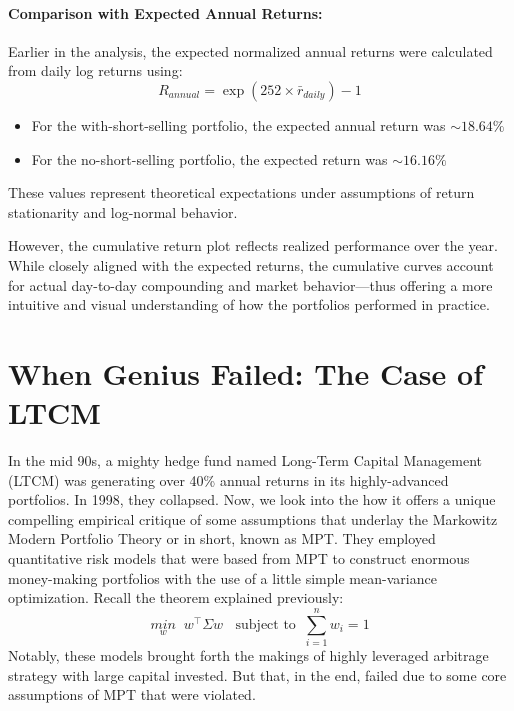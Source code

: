 \documentclass[11pt]{article}
\begin{document}
\paragraph{Comparison with Expected Annual Returns:}
Earlier in the analysis, the expected normalized annual returns were calculated from daily log returns using:
\[R_{annual}=\exp(252\times \bar{r}_{daily})-1\]
\begin{itemize}
    \item For the with-short-selling portfolio, the expected annual return was $\sim 18.64\%$
    \item For the no-short-selling portfolio, the expected return was $\sim 16.16\%$
\end{itemize}
These values represent theoretical expectations under assumptions of return stationarity and log-normal behavior.\par
However, the cumulative return plot reflects realized performance over the year. While closely aligned with the expected returns, the cumulative curves account for actual day-to-day compounding and market behavior—thus offering a more intuitive and visual understanding of how the portfolios performed in practice.

\section{When Genius Failed: The Case of LTCM}

    In the mid 90s, a mighty hedge fund named Long-Term Capital Management (LTCM) was generating over 40\% annual returns in its highly-advanced portfolios. In 1998, they collapsed. Now, we look into the how it offers a unique compelling empirical critique of some assumptions that underlay the Markowitz Modern Portfolio Theory or in short, known as MPT. They employed quantitative risk models that were based from MPT to construct enormous money-making portfolios with the use of a little simple mean-variance optimization. Recall the theorem explained previously:
    \begin{equation}
        \underset{w}{min}\;\; w^\intercal\Sigma w\;\;\text{ subject to}\;\; \sum_{i=1}^nw_i = 1
    \end{equation}
    Notably, these models brought forth the makings of highly leveraged arbitrage strategy with large capital invested. But that, in the end, failed due to some core assumptions of MPT that were violated. 
\end{document}
